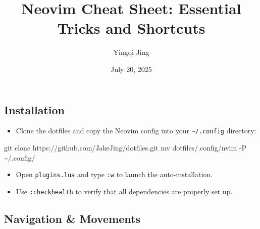 \documentclass[
  letterpaper,
  DIV=11,
  numbers=noendperiod]{scrartcl}
\title{Neovim Cheat Sheet: Essential Tricks and Shortcuts}
\author{Yingqi Jing}
\date{July 20, 2025}
\newenvironment{Shaded}{}{}
\newcommand{\AttributeTok}[1]{\textcolor[rgb]{0.65,0.15,0.64}{#1}}
\newcommand{\FunctionTok}[1]{\textcolor[rgb]{0.25,0.47,0.95}{#1}}
\newcommand{\NormalTok}[1]{\textcolor[rgb]{0.22,0.23,0.26}{#1}}
\providecommand{\tightlist}{%
  \setlength{\itemsep}{0pt}\setlength{\parskip}{0pt}}\usepackage{longtable,booktabs,array}
\renewcommand*\contentsname{Table of contents}
\newcommand\contentsname{Table of contents}
\begin{document}
\maketitle

\renewcommand*\contentsname{Contents}
{
\hypersetup{linkcolor=}
\setcounter{tocdepth}{4}
\tableofcontents
}
\listoffigures
\listoftables

\clearpage

\subsection{Installation}\label{installation}

\begin{itemize}
\tightlist
\item
  Clone the dotfiles and copy the Neovim config into your
  \texttt{\textasciitilde{}/.config} directory:
\end{itemize}

\begin{Shaded}
\begin{Highlighting}[]
\FunctionTok{git}\NormalTok{ clone https://github.com/JakeJing/dotfiles.git}
\FunctionTok{mv}\NormalTok{ dotfiles/.config/nvim }\AttributeTok{{-}P}\NormalTok{ \textasciitilde{}/.config/}
\end{Highlighting}
\end{Shaded}

\begin{itemize}
\tightlist
\item
  Open \texttt{plugins.lua} and type \texttt{:w} to launch the
  auto-installation.
\item
  Use \texttt{:checkhealth} to verify that all dependencies are properly
  set up.
\end{itemize}

\subsection{Navigation \& Movements}\label{navigation-movements}
\end{document}
